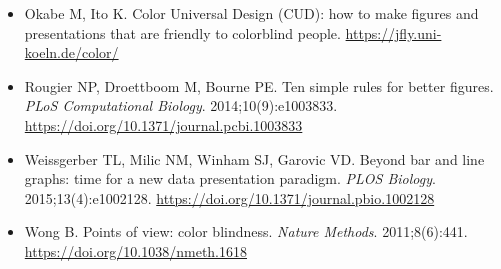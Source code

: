 \begin{itemize}
\item Okabe M, Ito K. Color Universal Design (CUD): how to make figures and presentations that are friendly to colorblind people. \url{https://jfly.uni-koeln.de/color/}
\item Rougier NP, Droettboom M, Bourne PE. Ten simple rules for better figures. \emph{PLoS Computational Biology}. 2014;10(9):e1003833. \url{https://doi.org/10.1371/journal.pcbi.1003833}
\item Weissgerber TL, Milic NM, Winham SJ, Garovic VD. Beyond bar and line graphs: time for a new data presentation paradigm. \emph{PLOS Biology}. 2015;13(4):e1002128. \url{https://doi.org/10.1371/journal.pbio.1002128}
\item Wong B. Points of view: color blindness. \emph{Nature Methods}. 2011;8(6):441. \url{https://doi.org/10.1038/nmeth.1618}
\end{itemize}

